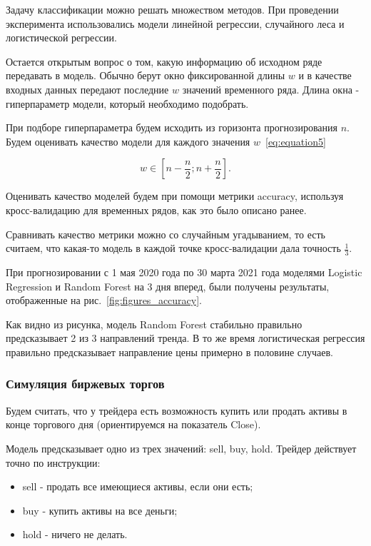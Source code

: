 \documentclass[a4paper,article,14pt]{extarticle}
\begin{document}
Задачу классификации можно решать множеством методов.
При проведении эксперимента использовались модели линейной регрессии, случайного леса и логистической регрессии.

Остается открытым вопрос о том, какую информацию об исходном ряде передавать в модель.
Обычно берут окно фиксированной длины $w$ и в качестве входных данных передают последние $w$ значений временного ряда.
Длина окна - гиперпараметр модели, который необходимо подобрать.

При подборе гиперпараметра будем исходить из горизонта прогнозирования $n$.
Будем оценивать качество модели для каждого значения $w$~\eqref{eq:equation5}

\begin{equation}
    \label{eq:equation5}
    w \in \left[ n - \frac{n}{2}; n + \frac{n}{2} \right].
\end{equation}

Оценивать качество моделей будем при помощи метрики accuracy, используя кросс-валидацию для временных рядов, как это было описано ранее.

Сравнивать качество метрики можно со случайным угадыванием, то есть считаем, что какая-то модель в каждой точке кросс-валидации дала точность $\frac{1}{3}$.

При прогнозировании с 1 мая 2020 года по 30 марта 2021 года моделями Logistic Regression и Random Forest на 3 дня вперед, были получены результаты, отображенные на рис.~\ref{fig:figures_accuracy}.

Как видно из рисунка, модель Random Forest стабильно правильно предсказывает 2 из 3 направлений тренда.
В то же время логистическая регрессия правильно предсказывает направление цены примерно в половине случаев.



\subsubsection{Симуляция биржевых торгов}

Будем считать, что у трейдера есть возможность купить или продать активы в конце торгового дня (ориентируемся на показатель Close).

Модель предсказывает одно из трех значений: sell, buy, hold.
Трейдер действует точно по инструкции:

\begin{itemize}
    \item sell - продать все имеющиеся активы, если они есть;
    \item buy - купить активы на все деньги;
    \item hold - ничего не делать.
\end{itemize}
\end{document}

